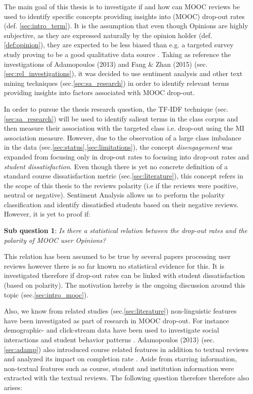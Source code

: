 \documentclass[
	a4paper,
	pdftex,
	12pt,	
	footinclude=true,
	fleqn,
	final,
	]{report}%
\begin{document}
The main goal of this thesis is to investigate if and how can MOOC 
reviews be used to identify specific concepts providing insights into (MOOC) 
drop-out rates (def. \ref{sec:intro_term}). 
It is the assumption that even though Opinions are highly 
subjective, as they are expressed naturally by the opinion holder 
(def. \ref{def:opinion}), they are expected to be less biased than 
e.g. a targeted survey study \cite{Pennebaker2010} proving to be a 
good qualitative data source \cite{Mehl2006}. Taking as reference 
the investigations of Adamopoulos (2013) and Fang \& Zhan (2015) 
(sec.\ref{sec:rel_investigations}), it was decided to use sentiment 
analysis and other text mining techniques (sec.\ref{sec:sa_research})
in order to identify relevant terms providing insights into factors 
associated with MOOC drop-out. 

In order to pursue the thesis research question,
the TF-IDF technique (sec.\ref{sec:sa_research}) will be 
used to identify salient terms in the class corpus and 
then measure their association with the targeted class i.e. drop-out 
using the MI association measure. 
However, due to the observation of a large  
class imbalance in the data (sec.\ref{sec:status},\ref{sec:limitations}), 
the concept \emph{disengagement} was expanded from focusing only in drop-out rates
to focusing into drop-out rates and \emph{student dissatisfaction}.
Even though there is yet no concrete definition of a 
standard course dissatisfaction metric (sec.\ref{sec:literature}),
this concept refers in the scope of this thesis to the reviews polarity
(i.e if the reviews were positive, neutral or negative).
Sentiment Analysis allows us to perform the
polarity classification and identify dissatisfied 
students based on their negative reviews. However, it is yet to proof
if:

\textbf{Sub question 1}: \textit{Is there a statistical relation between the 
drop-out rates and the polarity of MOOC user Opinions?}

This relation has been assumed to be true by several papers 
\cite{Pang2008,Adamopoulos2013,Fang2015} processing user reviews
however there is so far known no statistical evidence for this. 
It is investigated therefore if drop-out rates can be linked
with student dissatisfaction (based on polarity). 
The motivation hereby is the ongoing discussion 
around this topic (sec.\ref{sec:intro_mooc}).

Also, we know from related studies (sec.\ref{sec:literature}) 
non-linguistic features have been investigated as part of
research in MOOC drop-out. For instance demographic- \cite{Christensen2013,Ho2013} 
and click-stream data have been used to investigate social
interactions and student behavior patterns \cite{Rose2014}. 
Adamopoulos (2013) (sec.\ref{sec:adamp}) also 
introduced course related features in addition to textual reviews
and analyzed its impact on completion rate \cite{Adamopoulos2013}.
Aside from starring information, non-textual 
features such as course, student and institution information 
were extracted with the textual reviews. The following question 
therefore therefore also arises:
\end{document}
